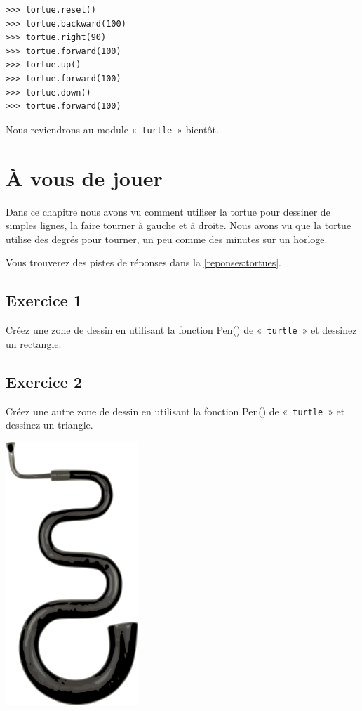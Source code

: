 \begin{Verbatim}[frame=single,rulecolor=\color{mbleu}, label=à taper]
>>> tortue.reset()
>>> tortue.backward(100)
>>> tortue.right(90)
>>> tortue.forward(100)
>>> tortue.up()
>>> tortue.forward(100)
>>> tortue.down()
>>> tortue.forward(100)
\end{Verbatim}

Nous reviendrons au module «~\texttt{turtle}~»  bientôt.

\section{À vous de jouer}\label{pratique:tortues}
Dans ce chapitre nous avons vu comment utiliser la tortue pour dessiner de simples lignes, la faire tourner à gauche et à droite. Nous avons vu que la tortue utilise des degrés pour tourner, un peu comme des minutes sur un horloge.

Vous trouverez des pistes de réponses dans la \autoref{reponses:tortues}.
\subsection*{Exercice 1}
Créez une zone de dessin en utilisant la fonction Pen() de «~\texttt{turtle}~» et dessinez un rectangle.
\subsection*{Exercice 2}
Créez une autre zone de dessin en utilisant la fonction Pen() de «~\texttt{turtle}~» et dessinez un triangle.
 \vfill
\begin{center}
 \includegraphics[width=5cm]{images/sem.pdf}
\end{center}
 \vfill

\clearemptydoublepage